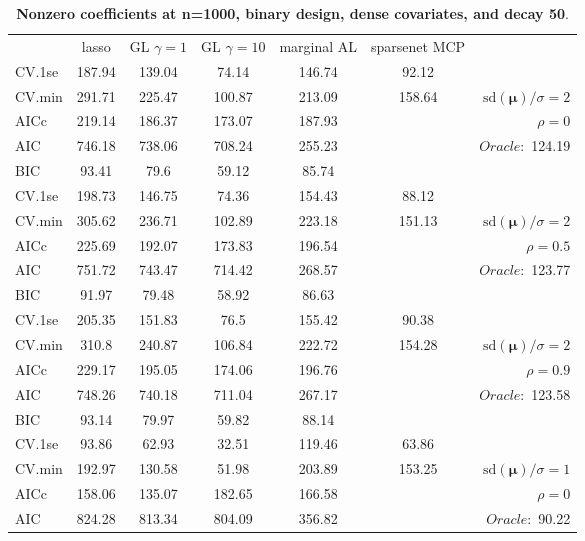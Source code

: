 \begin{table}\vspace{-.5cm}
\caption[l]{ { \bf Nonzero coefficients at n=1000, binary design, 
dense covariates, and  decay  50}.}
\vspace{-.5cm}
\footnotesize{}
\begin{center}
\begin{tabular}{l*{5}{c}|r}
& lasso & GL $\gamma=1$ & GL $\gamma=10$ & marginal AL & sparsenet MCP  & \\
 \cline{1-7}
CV.1se & 187.94 & 139.04 & 74.14 & 146.74 & 92.12 & \\
CV.min & 291.71 & 225.47 & 100.87 & 213.09 & 158.64 &  $\mathrm{sd}(\mathbf{\mu})/\sigma=2$ \\
AICc & 219.14 & 186.37 & 173.07 & 187.93 & & $\rho=0$ \\
AIC & 746.18 & 738.06 & 708.24 & 255.23 & &  \multirow{2}{*}{$Oracle: $ 124.19} \\
BIC & 93.41 & 79.6 & 59.12 & 85.74 & &  \\
 \hline 
CV.1se & 198.73 & 146.75 & 74.36 & 154.43 & 88.12 & \\
CV.min & 305.62 & 236.71 & 102.89 & 223.18 & 151.13 &  $\mathrm{sd}(\mathbf{\mu})/\sigma=2$ \\
AICc & 225.69 & 192.07 & 173.83 & 196.54 & & $\rho=0.5$ \\
AIC & 751.72 & 743.47 & 714.42 & 268.57 & &  \multirow{2}{*}{$Oracle: $ 123.77} \\
BIC & 91.97 & 79.48 & 58.92 & 86.63 & &  \\
 \hline 
CV.1se & 205.35 & 151.83 & 76.5 & 155.42 & 90.38 & \\
CV.min & 310.8 & 240.87 & 106.84 & 222.72 & 154.28 &  $\mathrm{sd}(\mathbf{\mu})/\sigma=2$ \\
AICc & 229.17 & 195.05 & 174.06 & 196.76 & & $\rho=0.9$ \\
AIC & 748.26 & 740.18 & 711.04 & 267.17 & &  \multirow{2}{*}{$Oracle: $ 123.58} \\
BIC & 93.14 & 79.97 & 59.82 & 88.14 & &  \\
 \hline 
CV.1se & 93.86 & 62.93 & 32.51 & 119.46 & 63.86 & \\
CV.min & 192.97 & 130.58 & 51.98 & 203.89 & 153.25 &  $\mathrm{sd}(\mathbf{\mu})/\sigma=1$ \\
AICc & 158.06 & 135.07 & 182.65 & 166.58 & & $\rho=0$ \\
AIC & 824.28 & 813.34 & 804.09 & 356.82 & &  \multirow{2}{*}{$Oracle: $ 90.22} \\

\end{tabular}
\end{center}
\end{table}
